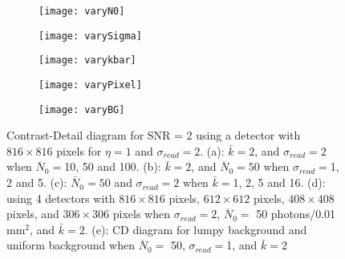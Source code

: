 \begin{figure}[ht]
	\begin{subfigure}[b]{0.3\linewidth}
		\texttt{[image: varyN0]}
		\caption{}
		\label{fig:varyN0}
	\end{subfigure}
	\hspace{0.2cm}
	\begin{subfigure}[b]{0.3\linewidth}
		\texttt{[image: varySigma]}
		\caption{}
		\label{fig:varySigma}
	\end{subfigure}
	\hspace{0.2cm}	
	\begin{subfigure}[b]{0.3\linewidth}
		\texttt{[image: varykbar]}
		\caption{}
		\label{fig:varykbar}
	\end{subfigure}
	\begin{subfigure}[b]{0.3\linewidth}
		\texttt{[image: varyPixel]}
		\caption{}
		\label{fig:varyPixel}
	\end{subfigure}	
	\hspace{0.2cm}	
	\begin{subfigure}[b]{0.3\linewidth}
		\texttt{[image: varyBG]}
		\caption{}
		\label{fig:varyBG}
	\end{subfigure}
\caption{Contrast-Detail diagram for SNR = 2 using a detector with $816 \times 816$ pixels for $\eta = 1$ and $\sigma_{read} = 2$.  (a): $\bar{k} = 2$, and $\sigma_{read} = 2$ when $\overline{N}_0 = $10, 50 and 100.  (b): $\bar{k} = 2$, and $\overline{N}_0 = 50$ when $ \sigma_{read} = $1, 2 and 5.  (c): $\bar{N}_0 = 50$ and $\sigma_{read} = 2$ when $\bar{k} = $1, 2, 5 and 16.  (d): using 4 detectors with $816 \times 816$ pixels, $612 \times 612$ pixels, $408 \times 408$ pixels, and $306 \times 306$ pixels when $\sigma_{read} = 2$, $\overline{N}_0 =$ 50 photons/0.01 mm$^2$, and $\bar{k} = 2$. (e): CD diagram for lumpy background and uniform background when $\overline{N}_0 =$ 50, $\sigma_{read} = $1, and $\bar{k} = $2}
\label{fig:CD} 
\end{figure}
%
